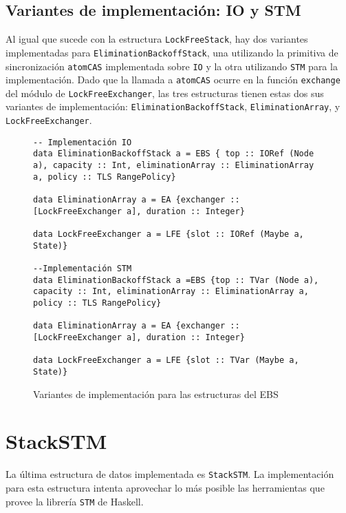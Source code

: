 \clearpage
\subsection{Variantes de implementación: IO y STM}
Al igual que sucede con la estructura \texttt{LockFreeStack}, hay dos variantes implementadas para \texttt{EliminationBackoffStack}, una utilizando la primitiva de sincronización \texttt{atomCAS} implementada sobre \texttt{IO} y la otra utilizando \texttt{STM} para la implementación.
Dado que la llamada a \texttt{atomCAS} ocurre en la función \texttt{exchange} del módulo de \texttt{LockFreeExchanger}, las tres estructuras tienen estas dos sus variantes de implementación: \texttt{EliminationBackoffStack}, \texttt{EliminationArray}, y \texttt{LockFreeExchanger}.

\begin{figure}[H]
\begin{verbatim}
-- Implementación IO
data EliminationBackoffStack a = EBS { top :: IORef (Node a), capacity :: Int, eliminationArray :: EliminationArray a, policy :: TLS RangePolicy}

data EliminationArray a = EA {exchanger :: [LockFreeExchanger a], duration :: Integer}

data LockFreeExchanger a = LFE {slot :: IORef (Maybe a, State)}

--Implementación STM
data EliminationBackoffStack a =EBS {top :: TVar (Node a), capacity :: Int, eliminationArray :: EliminationArray a, policy :: TLS RangePolicy}

data EliminationArray a = EA {exchanger :: [LockFreeExchanger a], duration :: Integer}

data LockFreeExchanger a = LFE {slot :: TVar (Maybe a, State)}
\end{verbatim}
\caption{Variantes de implementación para las estructuras del EBS}
\end{figure}

\clearpage
\section{StackSTM}
La última estructura de datos implementada es \texttt{StackSTM}. La implementación para esta estructura intenta aprovechar lo más posible las herramientas que provee la librería \texttt{STM} de Haskell.


